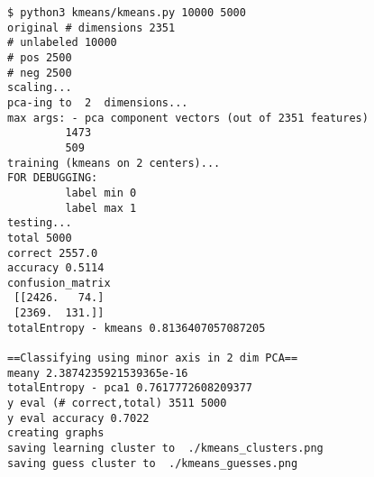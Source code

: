 \begin{lstlisting}
$ python3 kmeans/kmeans.py 10000 5000
original # dimensions 2351
# unlabeled 10000
# pos 2500
# neg 2500
scaling...
pca-ing to  2  dimensions...
max args: - pca component vectors (out of 2351 features)
         1473
         509
training (kmeans on 2 centers)...
FOR DEBUGGING:
         label min 0
         label max 1
testing...
total 5000
correct 2557.0
accuracy 0.5114
confusion_matrix
 [[2426.   74.]
 [2369.  131.]]
totalEntropy - kmeans 0.8136407057087205

==Classifying using minor axis in 2 dim PCA==
meany 2.3874235921539365e-16
totalEntropy - pca1 0.7617772608209377
y eval (# correct,total) 3511 5000
y eval accuracy 0.7022
creating graphs
saving learning cluster to  ./kmeans_clusters.png
saving guess cluster to  ./kmeans_guesses.png
\end{lstlisting}
